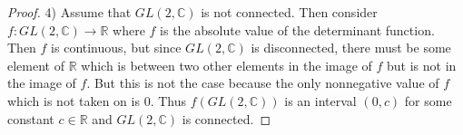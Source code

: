\documentclass{article}
\begin{document}
\begin{flushleft}
\begin{proof}
4) Assume that $GL(2, \mathbb{C})$ is not connected. Then consider $f : GL(2, \mathbb{C}) \rightarrow \mathbb{R}$ where $f$ is the absolute value of the determinant function. Then $f$ is continuous, but since $GL(2, \mathbb{C})$ is disconnected, there must be some element of $\mathbb{R}$ which is between two other elements in the image of $f$ but is not in the image of $f$. But this is not the case because the only nonnegative value of $f$ which is not taken on is $0$. Thus $f(GL(2, \mathbb{C}))$ is an interval $(0, c)$ for some constant $c \in \mathbb{R}$ and $GL(2, \mathbb{C})$ is connected.
\end{proof}

\end{flushleft}
\end{document}
